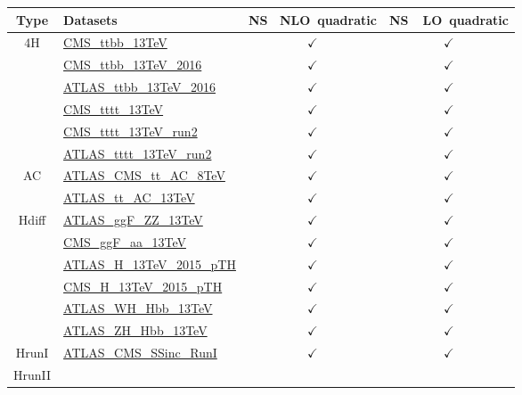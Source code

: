 \documentclass{article}
\begin{document}
\begin{table}[H]
\footnotesize
\centering
\begin{tabular}{|c|l|c|c|}
\hline
 Type & Datasets  & \rm NS \ NLO\ quadratic & \rm NS\ \ LO\ quadratic \\ \hline
\multirow{6}{*}{4H}
 & \href{https://arxiv.org/abs/1705.10141}{CMS_ttbb_13TeV}  & $\checkmark$ & $\checkmark$\\ \cline{2-4}
 & \href{https://arxiv.org/abs/1909.05306}{CMS_ttbb_13TeV_2016}  & $\checkmark$ & $\checkmark$\\ \cline{2-4}
 & \href{https://arxiv.org/abs/1811.12113}{ATLAS_ttbb_13TeV_2016}  & $\checkmark$ & $\checkmark$\\ \cline{2-4}
 & \href{https://arxiv.org/abs/1710.10614}{CMS_tttt_13TeV}  & $\checkmark$ & $\checkmark$\\ \cline{2-4}
 & \href{https://arxiv.org/abs/1908.06463}{CMS_tttt_13TeV_run2}  & $\checkmark$ & $\checkmark$\\ \cline{2-4}
 & \href{https://arxiv.org/abs/2007.14858}{ATLAS_tttt_13TeV_run2}  & $\checkmark$ & $\checkmark$
\\ \hline
\multirow{2}{*}{AC}
 & \href{https://arxiv.org/abs/1709.05327}{ATLAS_CMS_tt_AC_8TeV}  & $\checkmark$ & $\checkmark$\\ \cline{2-4}
 & \href{https://cds.cern.ch/record/2682109}{ATLAS_tt_AC_13TeV}  & $\checkmark$ & $\checkmark$
\\ \hline
\multirow{6}{*}{Hdiff}
 & \href{https://arxiv.org/abs/1909.02845}{ATLAS_ggF_ZZ_13TeV}  & $\checkmark$ & $\checkmark$\\ \cline{2-4}
 & \href{https://inspirehep.net/literature/1725274}{CMS_ggF_aa_13TeV}  & $\checkmark$ & $\checkmark$\\ \cline{2-4}
 & \href{https://inspirehep.net/literature/1743896}{ATLAS_H_13TeV_2015_pTH}  & $\checkmark$ & $\checkmark$\\ \cline{2-4}
 & \href{https://arxiv.org/abs/1812.06504}{CMS_H_13TeV_2015_pTH}  & $\checkmark$ & $\checkmark$\\ \cline{2-4}
 & \href{https://arxiv.org/abs/1903.04618}{ATLAS_WH_Hbb_13TeV}  & $\checkmark$ & $\checkmark$\\ \cline{2-4}
 & \href{https://arxiv.org/abs/1903.04618}{ATLAS_ZH_Hbb_13TeV}  & $\checkmark$ & $\checkmark$
\\ \hline
\multirow{1}{*}{HrunI}
 & \href{https://arxiv.org/abs/1606.02266}{ATLAS_CMS_SSinc_RunI}  & $\checkmark$ & $\checkmark$
\\ \hline
\multirow{2}{*}{HrunII}

\end{tabular}
\end{table}
\end{document}

